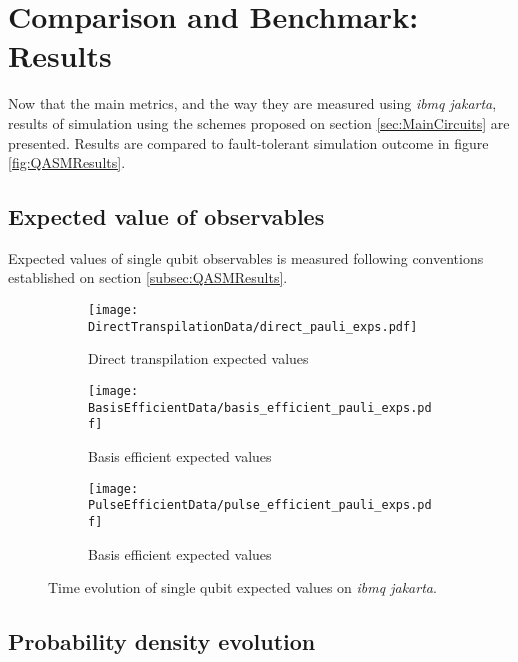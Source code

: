 \section{Comparison and Benchmark: Results}
\label{sec:Results}

    Now that the main metrics, and the way they are measured using \textit{ibmq jakarta}, results of simulation using the schemes proposed on section \ref{sec:MainCircuits} are presented. Results are compared to fault-tolerant simulation outcome in figure \ref{fig:QASMResults}.

    \subsection{Expected value of observables}
    \label{subsec:PauliResults}

      Expected values of single qubit observables is measured following conventions established on section \ref{subsec:QASMResults}. 

      \begin{figure}
        \centering
        \begin{subfigure}[b]{1.0 \textwidth}
          \centering
          \texttt{[image: DirectTranspilationData/direct\_pauli\_exps.pdf]}
          \caption{Direct transpilation expected values}
          \label{fig:PauliDirectTransp}
        \end{subfigure}
        \begin{subfigure}[b]{1.0 \textwidth}
          \centering
          \texttt{[image: BasisEfficientData/basis\_efficient\_pauli\_exps.pdf]}
          \caption{Basis efficient expected values}
          \label{fig:PauliBasis}
        \end{subfigure}
        \begin{subfigure}[b]{1.0 \textwidth}
          \centering
          \texttt{[image: PulseEfficientData/pulse\_efficient\_pauli\_exps.pdf]}
          \caption{Basis efficient expected values}
          \label{fig:PauliPulse}
        \end{subfigure}
        \caption{Time evolution of single qubit expected values on \textit{ibmq jakarta}.}
        \label{fig:PauliExpectedValues}
      \end{figure}

    \subsection{Probability density evolution}
    \label{subsec:PdfResults}

